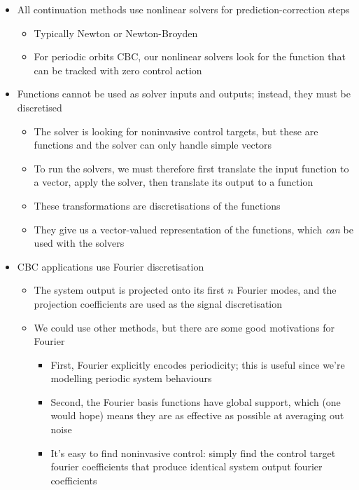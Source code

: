 \documentclass[11pt]{article}
\begin{document}
\begin{itemize}
\item All continuation methods use nonlinear solvers for prediction-correction steps
\begin{itemize}
\item Typically Newton or Newton-Broyden
\item For periodic orbits CBC, our nonlinear solvers look for the function that can be tracked with zero control action
\end{itemize}

\item Functions cannot be used as solver inputs and outputs; instead, they must be discretised
\begin{itemize}
\item The solver is looking for noninvasive control targets, but these are functions and the solver can only handle simple vectors
\item To run the solvers, we must therefore first translate the input function to a vector, apply the solver, then translate its output to a function
\item These transformations are discretisations of the functions
\item They give us a vector-valued representation of the functions, which \emph{can} be used with the solvers
\end{itemize}

\item CBC applications use Fourier discretisation
\begin{itemize}
\item The system output is projected onto its first \(n\) Fourier modes, and the projection coefficients are used as the signal discretisation
\item We could use other methods, but there are some good motivations for Fourier
\begin{itemize}
\item First, Fourier explicitly encodes periodicity; this is useful since we're modelling periodic system behaviours
\item Second, the Fourier basis functions have global support, which (one would hope) means they are as effective as possible at averaging out noise
\item It's easy to find noninvasive control: simply find the control target fourier coefficients that produce identical system output fourier coefficients
\end{itemize}
\end{itemize}


\end{itemize}
\end{document}

